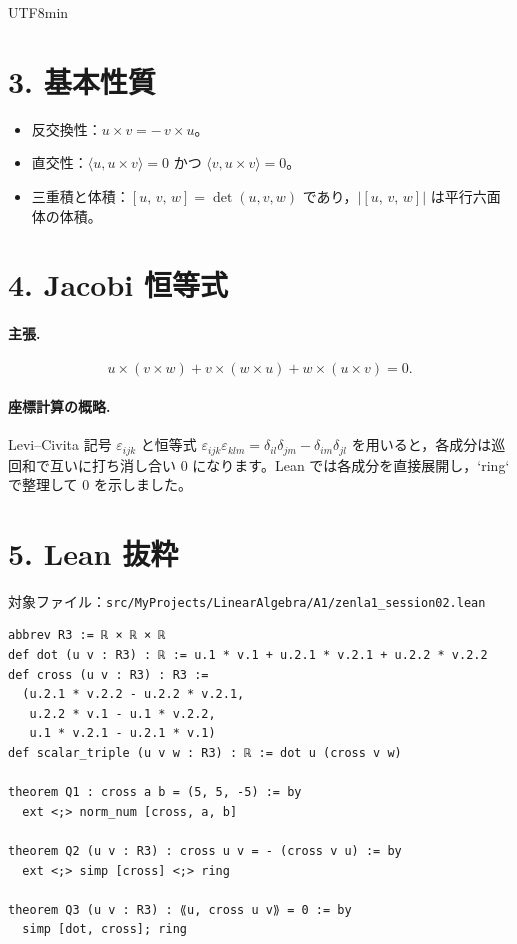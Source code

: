 \documentclass[luatexja,ja=standard,a4paper,12pt]{bxjsarticle}
\newcommand{\cross}{\times}
\newcommand{\triple}[3]{\left[ #1,\,#2,\,#3 \right]}
\begin{document}
\begin{CJK}{UTF8}{min}
\section*{3. 基本性質}
\begin{itemize}
  \item 反交換性：\(u\cross v = -\,v\cross u\)。
  \item 直交性：\(\langle u, u\cross v\rangle=0\) かつ \(\langle v, u\cross v\rangle=0\)。
  \item 三重積と体積：\(\triple{u}{v}{w}=\det(u,v,w)\) であり，\(|\triple{u}{v}{w}|\) は平行六面体の体積。
\end{itemize}

\section*{4. Jacobi 恒等式}
\paragraph{主張.}\[u\cross(v\cross w) + v\cross(w\cross u) + w\cross(u\cross v) = 0.\]
\paragraph{座標計算の概略.} Levi--Civita 記号 \(\varepsilon_{ijk}\) と恒等式 \(\varepsilon_{ijk}\varepsilon_{klm}=\delta_{il}\delta_{jm}-\delta_{im}\delta_{jl}\) を用いると，各成分は巡回和で互いに打ち消し合い 0 になります。Lean では各成分を直接展開し，`ring` で整理して 0 を示しました。

\section*{5. Lean 抜粋}
対象ファイル：\texttt{src/MyProjects/LinearAlgebra/A1/zenla1\_session02.lean}
\begin{lstlisting}
abbrev R3 := ℝ × ℝ × ℝ
def dot (u v : R3) : ℝ := u.1 * v.1 + u.2.1 * v.2.1 + u.2.2 * v.2.2
def cross (u v : R3) : R3 :=
  (u.2.1 * v.2.2 - u.2.2 * v.2.1,
   u.2.2 * v.1 - u.1 * v.2.2,
   u.1 * v.2.1 - u.2.1 * v.1)
def scalar_triple (u v w : R3) : ℝ := dot u (cross v w)

theorem Q1 : cross a b = (5, 5, -5) := by
  ext <;> norm_num [cross, a, b]

theorem Q2 (u v : R3) : cross u v = - (cross v u) := by
  ext <;> simp [cross] <;> ring

theorem Q3 (u v : R3) : ⟪u, cross u v⟫ = 0 := by
  simp [dot, cross]; ring


\end{lstlisting}
\end{CJK}
\end{document}

